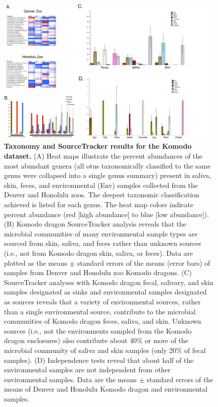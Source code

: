 \begin{figure}[htbp]
\includegraphics[width=1.15\columnwidth]{chapter_contributions_figures/KomodoSTest.pdf}
\caption[Taxonomy and SourceTracker results for the Komodo dataset]{\textbf{Taxonomy and SourceTracker results for the Komodo dataset.}
(A) Heat maps illustrate the percent abundances of the most abundant genera
(all \gls{otu}s taxonomically classified to the same genus were collapsed into
a single genus summary) present in saliva, skin, feces, and environmental (Env)
samples collected from the Denver and Honolulu zoos. The deepest taxonomic
classification achieved is listed for each genus. The heat map colors indicate
percent abundance (red [high abundance] to blue [low abundance]). (B) Komodo
dragon SourceTracker analysis reveals that the microbial communities of many
environmental sample types are sourced from skin, saliva, and feces rather than
unknown sources (i.e., not from Komodo dragon skin, saliva, or feces). Data are
plotted as the means $\pm$ standard errors of the means (error bars) of samples
from Denver and Honolulu zoo Komodo dragons. (C) SourceTracker analyses with
Komodo dragon fecal, salivary, and skin samples designated as sinks and environmental
samples designated as sources reveals that a variety of environmental sources,
rather than a single environmental source, contribute to the microbial communities
of Komodo dragon feces, saliva, and skin. Unknown sources (i.e., not the environments
sampled from the Komodo dragon enclosures) also contribute about 40\% or more of
the microbial community of saliva and skin samples (only 20\% of fecal samples).
(D) Independence tests reveal that about half of the environmental samples are not
independent from other environmental samples. Data are the means $\pm$ standard errors
of the means of Denver and Honolulu Komodo dragon and environmental samples.}
\label{KomodoST}
\end{figure}

